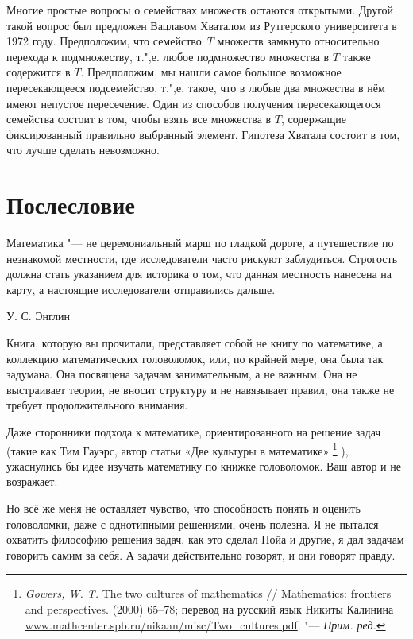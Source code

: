 \documentclass[twoside]{book}
\begin{document}
Многие простые вопросы о семействах множеств остаются открытыми.
Другой такой вопрос был предложен Вацлавом Хваталом из Рутгерского университета в 1972 году.
Предположим, что семейство~$T$ множеств замкнуто относительно перехода к подмножеству, т.",е. любое подмножество множества в $T$ также содержится в $T$.
Предположим,  мы нашли самое большое возможное пересекающееся подсемейство, т.",е. такое, что в любые два множества в нём имеют непустое пересечение.
Один из способов получения пересекающегося семейства состоит в том, чтобы взять все множества в $T$, содержащие фиксированный правильно выбранный элемент.
Гипотеза Хватала состоит в том, что лучше сделать невозможно.

\chapter{Послесловие}

\setlength{\epigraphwidth}{.6\textwidth}
\epigraph{Математика "--- не церемониальный марш по гладкой дороге, а путешествие по незнакомой местности, где исследователи часто рискуют заблудиться.
Строгость должна стать указанием для историка о том, что данная местность нанесена на карту, а настоящие исследователи отправились дальше.\vspace{1ex}}{У. С. Энглин
}

Книга, которую  вы прочитали, представляет собой не книгу по математике, а коллекцию математических головоломок, или, по крайней мере, она была так задумана.
Она посвящена задачам занимательным, а не важным.
Она не выстраивает теории, не вносит структуру и не навязывает правил, она также не требует продолжительного внимания.

Даже сторонники подхода к математике, ориентированного на решение задач (такие как Тим Гауэрс, автор статьи «Две культуры в математике»%
\footnote{\emph{Gowers, W. T.} The two cultures of mathematics /\!/ {Mathematics: frontiers and per\-spec\-tives.} (2000) 65--78; перевод на русский язык Никиты Калинина \href{http://www.mathcenter.spb.ru/nikaan/misc/Two_cultures.pdf}{\url{www.mathcenter.spb.ru/nikaan/misc/Two_cultures.pdf}}. "--- \emph{Прим. ред.}} ),
ужаснулись бы идее изучать математику по книжке головоломок.
Ваш автор и не возражает.

Но всё же меня не оставляет чувство, что способность понять и оценить головоломки, даже с однотипными решениями, очень полезна.
Я не пытался охватить  философию решения задач, как это сделал Пойа и другие, я дал задачам говорить самим за себя.
А задачи действительно говорят, и они говорят правду.
\end{document}
